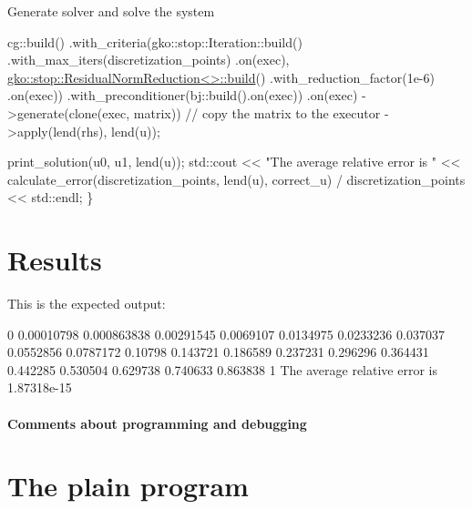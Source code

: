 Generate solver and solve the system


\begin{DoxyCode}
    cg::build()
        .with\_criteria(gko::stop::Iteration::build()
                           .with\_max\_iters(discretization\_points)
                           .on(exec),
                       \hyperlink{classgko_1_1stop_1_1ResidualNormReduction}{gko::stop::ResidualNormReduction<>::build}()
                           .with\_reduction\_factor(1e-6)
                           .on(exec))
        .with\_preconditioner(bj::build().on(exec))
        .on(exec)
        ->generate(clone(exec, matrix))  \textcolor{comment}{// copy the matrix to the executor}
        ->apply(lend(rhs), lend(u));

    print\_solution(u0, u1, lend(u));
    std::cout << \textcolor{stringliteral}{"The average relative error is "}
              << calculate\_error(discretization\_points, lend(u), correct\_u) /
                     discretization\_points
              << std::endl;
\}
\end{DoxyCode}
 \label{_Results}%
\section*{Results}

This is the expected output\+:


\begin{DoxyCode}
0
0.00010798
0.000863838
0.00291545
0.0069107
0.0134975
0.0233236
0.037037
0.0552856
0.0787172
0.10798
0.143721
0.186589
0.237231
0.296296
0.364431
0.442285
0.530504
0.629738
0.740633
0.863838
1
The average relative error is 1.87318e-15
\end{DoxyCode}


\label{_Commentsaboutprogramminganddebugging}%
\paragraph*{Comments about programming and debugging }

\label{_PlainProg}%
 \section*{The plain program}



